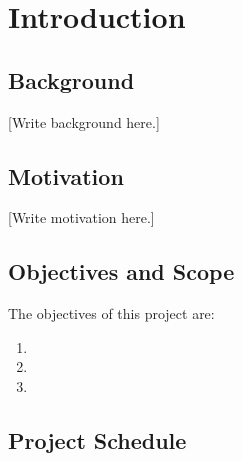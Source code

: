
\chapter{Introduction}
\label{ch:introduction}

\section{Background}
\label{sec:ch1:background}


[Write background here.]

\section{Motivation}
\label{sec:ch1:motivation}


[Write motivation here.]

\section{Objectives and Scope}
\label{sec:ch1:objectives}


The objectives of this project are:
\begin{enumerate}
    \item [Objective 1]
    \item [Objective 2]
    \item [Objective 3]
\end{enumerate}

\section{Project Schedule}
\label{sec:ch1:schedule}


